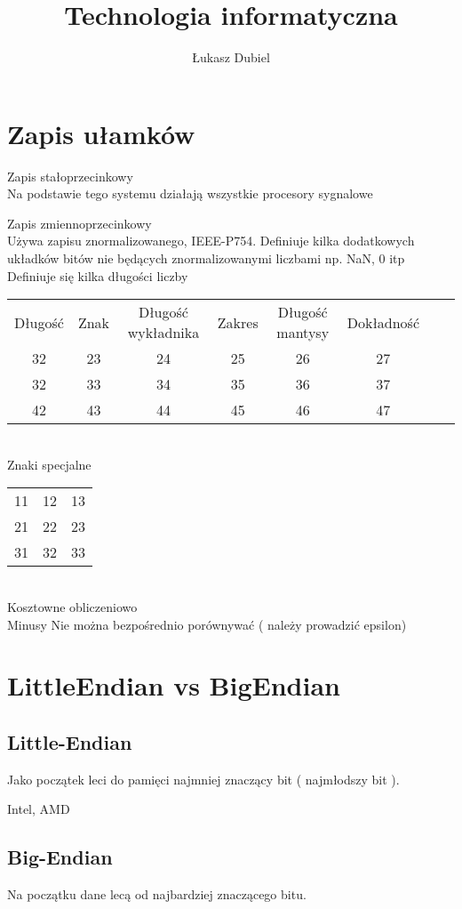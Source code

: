 \documentclass{article}
\title{Technologia informatyczna}
\author{Łukasz Dubiel}
\begin{document}
\maketitle
\section{Zapis ułamków}
Zapis stałoprzecinkowy \\
Na podstawie tego systemu działają wszystkie procesory sygnalowe

\bigskip
Zapis zmiennoprzecinkowy \\
Używa zapisu znormalizowanego, IEEE-P754.
Definiuje kilka dodatkowych układków bitów nie będących znormalizowanymi liczbami np. NaN, 0 itp \\
Definiuje się kilka długości liczby \\
\begin{tabular}{|cccccccc|}
\hline
	Długość & Znak & Długość wykładnika & Zakres & Długość mantysy & Dokładność \\
	32 & 23 & 24 & 25 & 26 & 27 \\
	32 & 33 & 34 & 35 & 36 & 37 \\
	42 & 43 & 44 & 45 & 46 & 47 \\
\hline
\end{tabular}\\
Znaki specjalne\\
\begin{tabular}{|ccc|}
\hline
	11 & 12 & 13\\
	21 & 22 & 23\\
	31 & 32 & 33\\
\hline
\end{tabular}\\
Kosztowne obliczeniowo\\
Minusy
Nie można bezpośrednio porównywać ( należy prowadzić epsilon)

\section{LittleEndian vs BigEndian}
\subsection{Little-Endian}
Jako początek leci do pamięci najmniej znaczący bit ( najmłodszy bit ).

Intel, AMD
\subsection{Big-Endian}
Na początku dane lecą od najbardziej znaczącego bitu.
\end{document}
